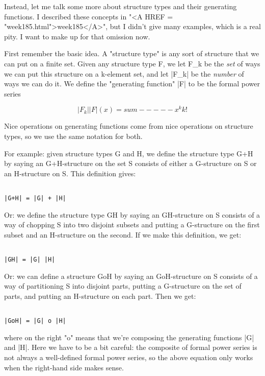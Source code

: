 Instead, let me talk some more about structure types and their generating
functions.  I described these concepts in "<A HREF = "week185.html">week185</A>", but I didn't give
many examples, which is a real pity.  I want to make up for that
omission now.  

First remember the basic idea.  A "structure type" is any sort of
structure that we can put on a finite set.  Given any structure type F,
we let F_{k} be the \emph{set} of ways we can put this structure on a k-element
set, and let |F_{k}| be the \emph{number} of ways we can do it.  We define the 
"generating function" |F| to be the formal power series


$$

               |F_{k}|  
|F|(x) = sum  -----  x^{k}
                k!
$$
    
Nice operations on generating functions come from nice operations on
structure types, so we use the same notation for both.  

For example: given structure types G and H, we define the structure 
type G+H by saying an G+H-structure on the set S consists of either a
G-structure on S or an H-structure on S.  This definition gives:


\begin{verbatim}

|G+H| = |G| + |H| 
\end{verbatim}
    
Or: we define the structure type GH by saying an GH-structure on S
consists of a way of chopping S into two disjoint subsets and putting 
a G-structure on the first subset and an H-structure on the second.  
If we make this definition, we get:


\begin{verbatim}

|GH| = |G| |H|
\end{verbatim}
    
Or: we can define a structure GoH by saying an GoH-structure on S
consists of a way of partitioning S into disjoint parts, putting 
a G-structure on the set of parts, and putting an H-structure on 
each part.  Then we get:


\begin{verbatim}

|GoH| = |G| o |H|
\end{verbatim}
    
where on the right "o" means that we're composing the generating
functions |G| and |H|.  Here we have to be a bit careful: the
composite of formal power series is not always a well-defined 
formal power series, so the above equation only works when the
right-hand side makes sense.

